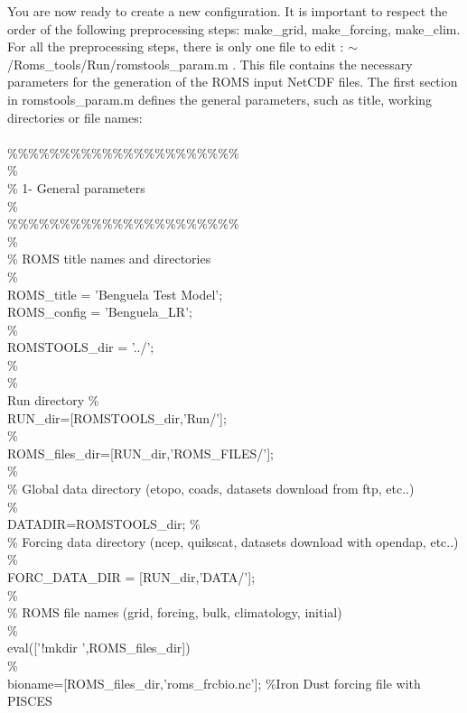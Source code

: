 You are now ready to create a new configuration.  It is important to
respect the order of the following preprocessing steps: make\_grid,
make\_forcing, make\_clim.  For all the preprocessing steps, there is
only one file to edit : $\sim$/Roms\_tools/Run/romstools\_param.m .
This file contains the necessary parameters for the generation of the
ROMS input NetCDF files.  The first section in romstools\_param.m
defines the general parameters, such as title, working directories or
file names:
\\ \\
\%\%\%\%\%\%\%\%\%\%\%\%\%\%\%\%\%\%\%\%\%\%\\
\%\\
\% 1- General parameters\\
\%\\
\%\%\%\%\%\%\%\%\%\%\%\%\%\%\%\%\%\%\%\%\%\%\\
\%\\
\%  ROMS title names and directories\\
\%\\
ROMS\_title  = 'Benguela Test Model';\\
ROMS\_config = 'Benguela\_LR';\\
\%\\
ROMSTOOLS\_dir = '../';\\
\%\\
\%\\ Run directory
\%\\
RUN\_dir=[ROMSTOOLS\_dir,'Run/'];\\
\%\\
ROMS\_files\_dir=[RUN\_dir,'ROMS\_FILES/'];\\
\%\\
\%  Global data directory (etopo, coads, datasets download from ftp, etc..)\\
\%\\
DATADIR=ROMSTOOLS\_dir; 
\%\\
\%  Forcing data directory (ncep, quikscat, datasets download with opendap, etc..)\\
\%\\
FORC\_DATA\_DIR = [RUN\_dir,'DATA/'];\\
\%\\
\% ROMS file names (grid, forcing, bulk, climatology, initial)\\
\%\\
eval(['!mkdir ',ROMS\_files\_dir]) \\
\%\\
bioname=[ROMS\_files\_dir,'roms\_frcbio.nc'];  \%Iron Dust forcing file with PISCES \\
